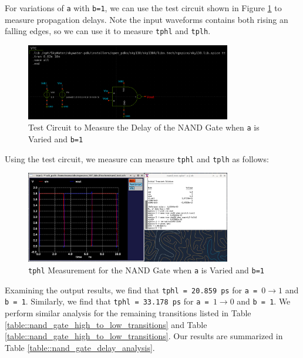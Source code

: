 \documentclass[fleqn]{article}
\begin{document}
	\noindent For variations of \texttt{a} with \texttt{b=1}, we can use the test circuit shown in Figure \ref{fig::nand_delay_test_sweep_va} to measure propagation delays. Note the input waveforms contains both rising an falling edges, so we can use it to measure \texttt{tphl} and \texttt{tplh}.

	\begin{figure}[H]
		\centerline{\includegraphics[width=0.8\textwidth]{nand_delay_test_sweep_va.png}}
		\caption{Test Circuit to Measure the Delay of the NAND Gate when \texttt{a} is Varied and \texttt{b=1}}
		\label{fig::nand_delay_test_sweep_va}
	\end{figure}
	
	\noindent Using the test circuit, we measure can measure \texttt{tphl} and \texttt{tplh} as follows:
	
	\begin{figure}[H]
		\centerline{\includegraphics[width=0.8\textwidth]{nand_delay_sweep_va.png}}
		\caption{\texttt{tphl} Measurement for the NAND Gate when \texttt{a} is Varied and \texttt{b=1}}
		\label{fig::nand_delay_sweep_va}
	\end{figure}
	
	Examining the output results, we find that \texttt{tphl = 20.859 ps} for \texttt{a = }$0 \rightarrow 1$ and \texttt{b = 1}. Similarly, we find that \texttt{tphl = 33.178 ps} for \texttt{a = }$1 \rightarrow 0$ and \texttt{b = 1}. We perform similar analysis for the remaining transitions listed in Table \ref{table::nand_gate_high_to_low_transitions} and Table \ref{table::nand_gate_high_to_low_transitions}. Our results are summarized in Table \ref{table::nand_gate_delay_analysis}.
	
\end{document}
